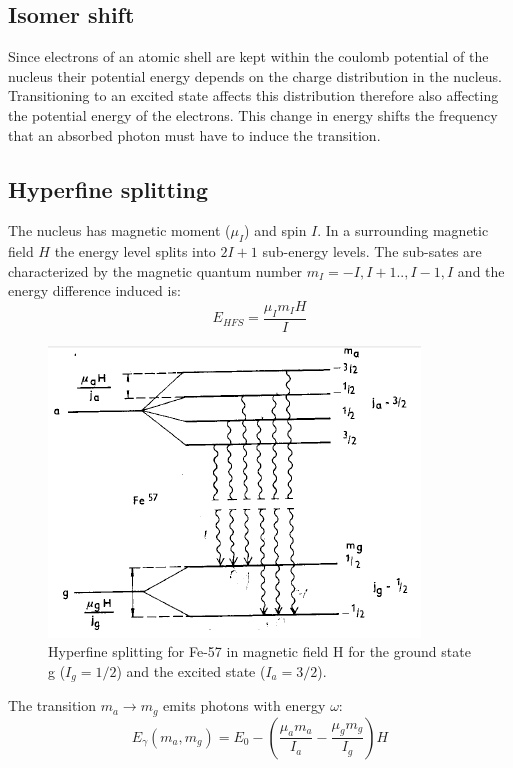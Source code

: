 \subsection{Isomer shift}
Since electrons of an atomic shell are kept within the coulomb potential of the nucleus their potential energy depends on the charge distribution in the nucleus. Transitioning to an excited state affects this distribution therefore also affecting the potential energy of the electrons. This change in energy shifts the frequency that an absorbed photon must have to induce the transition\cite{Wegener}.
\subsection{Hyperfine splitting}
The nucleus has magnetic moment ($\mu_I$) and spin $I$. In a surrounding magnetic field $H$ the energy level splits into $2I+1$ sub-energy levels. The sub-sates are characterized by the magnetic quantum number $m_I = -I,I+1..,I-1,I$ and the energy difference induced is:
\begin{equation}
E_{HFS}=\frac{\mu_I m_I H}{I}
\end{equation}
\begin{figure}[H]
\centering
\includegraphics[width=0.5\linewidth]{graphics/HFS}
\caption[Hyperfine splitting Fe-57]{Hyperfine splitting for Fe-57 in magnetic field H for the ground state g ($I_g = 1/2$) and the excited state ($I_a=3/2$).\cite{Wegener}}
\label{fig:HFS}
\end{figure}
The transition $m_a \rightarrow m_g$ emits photons with energy $\omega$:
\begin{equation}
E_\gamma(m_a,m_g) = E_0 - \left( \frac{\mu_a m_a}{I_a}-\frac{\mu_g m_g}{I_g}\right) H
\label{eq:HFS}
\end{equation}


